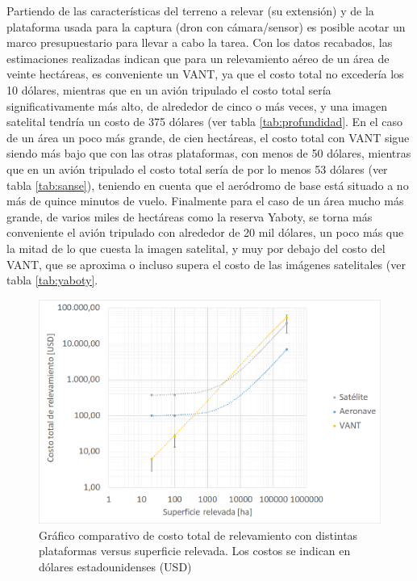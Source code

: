 Partiendo de las características del terreno a relevar (su extensión) y de la plataforma usada para la captura (dron con cámara/sensor) es posible acotar un marco presupuestario para llevar a cabo la tarea. Con los datos recabados, las estimaciones realizadas indican que para un relevamiento aéreo de un área de veinte hectáreas, es conveniente un VANT, ya que el costo total no excedería los 10 dólares, mientras que en un avión tripulado el costo total sería significativamente más alto, de alrededor de cinco o más veces, y una imagen satelital tendría un costo de 375 dólares (ver tabla \ref{tab:profundidad}. En el caso de un área un poco más grande, de cien hectáreas, el costo total con VANT sigue siendo más bajo que con las otras plataformas, con menos de 50 dólares, mientras que en un avión tripulado el costo total sería de por lo menos 53 dólares (ver tabla \ref{tab:sanse}), teniendo en cuenta que el aeródromo de base está situado a no más de quince minutos de vuelo. Finalmente para el caso de un área mucho más grande, de varios miles de hectáreas como la reserva Yaboty, se torna más conveniente el avión tripulado con alrededor de 20 mil dólares, un poco más que la mitad de lo que cuesta la imagen satelital, y muy por debajo del costo del VANT, que se aproxima o incluso supera el costo de las imágenes satelitales (ver tabla \ref{tab:yaboty}.


\begin{figure}[h!]
    \includegraphics[width=\textwidth]{Imagenes/grafico bloque 1.png}
     \hfill
     \caption{Gráfico comparativo de costo total de relevamiento con distintas plataformas versus superficie relevada. Los costos se indican en dólares estadounidenses (USD)}
    \label{grafico_comparativo}
\end{figure}

